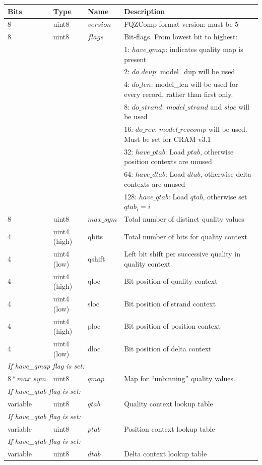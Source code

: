 \documentclass[a4paper]{article}
\begin{document}
\begin{tabular}{lllp{10cm}}
\hline
\textbf{Bits} & \textbf{Type} & \textbf{Name} & \textbf{Description}\\
\hline
8 & uint8 & $version$ & FQZComp format version: must be 5\\
8 & uint8 & $flags$ & Bit-flags. From lowest bit to highest:\\
& & & 1: $have\_qmap$: indicates quality map is present\\
& & & 2: $do\_deup$: model\_dup will be used\\
& & & 4: $do\_len$: model\_len will be used for every record, rather than first only.\\
& & & 8: $do\_strand$: $model\_strand$ and $sloc$ will be used\\
& & & 16: $do\_rev$: $model\_revcomp$ will be used. Must be set for CRAM v3.1\\
& & & 32: $have\_ptab$: Load $ptab$, otherwise position contexts are unused\\
& & & 64: $have\_dtab$: Load $dtab$, otherwise delta contexts are unused\\
& & & 128: $have\_qtab$: Load $qtab$, otherwise set $qtab_i = i$\\
8 & uint8 & $max\_sym$ & Total number of distinct quality values\\
\hline
4 & uint4 (high) & qbits  & Total number of bits for quality context\\
4 & uint4 (low)  & qshift & Left bit shift per successive quality in quality context\\
4 & uint4 (high) & qloc   & Bit position of quality context\\
4 & uint4 (low)  & sloc   & Bit position of strand context\\
4 & uint4 (high) & ploc   & Bit position of position context\\
4 & uint4 (low)  & dloc   & Bit position of delta context\\
\hline
\multicolumn{4}{l}{\textit{If have\_qmap flag is set:}}\\
$8*max\_sym$ & uint8 & $qmap$ & Map for ``unbinning'' quality values.\\
\hline
\multicolumn{4}{l}{\textit{If have\_qtab flag is set:}}\\
variable & uint8 & $qtab$ & Quality context lookup table\\
\hline
\multicolumn{4}{l}{\textit{If have\_qtab flag is set:}}\\
variable & uint8 & $ptab$ & Position context lookup table\\
\hline
\multicolumn{4}{l}{\textit{If have\_qtab flag is set:}}\\
variable & uint8 & $dtab$ & Delta context lookup table\\
\hline
\end{tabular}
\end{document}
